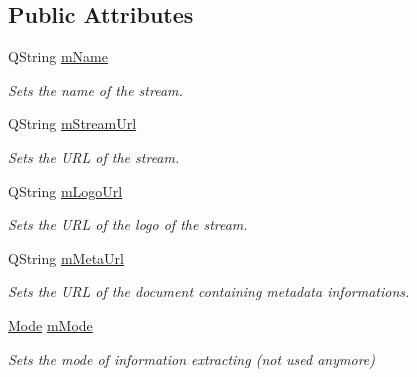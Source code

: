 \subsection*{Public Attributes}
\begin{DoxyCompactItemize}
\item 
\hypertarget{classProfile_ae9cc747f1b1a296a71535cc21c1f2e23}{
QString \hyperlink{classProfile_ae9cc747f1b1a296a71535cc21c1f2e23}{mName}}
\label{classProfile_ae9cc747f1b1a296a71535cc21c1f2e23}

\begin{DoxyCompactList}\small\item\em Sets the name of the stream. \item\end{DoxyCompactList}\item 
\hypertarget{classProfile_a480028e8369430791b8cc654d00442b2}{
QString \hyperlink{classProfile_a480028e8369430791b8cc654d00442b2}{mStreamUrl}}
\label{classProfile_a480028e8369430791b8cc654d00442b2}

\begin{DoxyCompactList}\small\item\em Sets the URL of the stream. \item\end{DoxyCompactList}\item 
\hypertarget{classProfile_a91bf8827db31d458cce1d3c3879e3042}{
QString \hyperlink{classProfile_a91bf8827db31d458cce1d3c3879e3042}{mLogoUrl}}
\label{classProfile_a91bf8827db31d458cce1d3c3879e3042}

\begin{DoxyCompactList}\small\item\em Sets the URL of the logo of the stream. \item\end{DoxyCompactList}\item 
\hypertarget{classProfile_a933dd175061d08e461c9cd409b957ede}{
QString \hyperlink{classProfile_a933dd175061d08e461c9cd409b957ede}{mMetaUrl}}
\label{classProfile_a933dd175061d08e461c9cd409b957ede}

\begin{DoxyCompactList}\small\item\em Sets the URL of the document containing metadata informations. \item\end{DoxyCompactList}\item 
\hypertarget{classProfile_abb0cd46ca588d24282e443d1481fcc49}{
\hyperlink{classProfile_a5fd99d2c6609c9239cd94d9208f6051b}{Mode} \hyperlink{classProfile_abb0cd46ca588d24282e443d1481fcc49}{mMode}}
\label{classProfile_abb0cd46ca588d24282e443d1481fcc49}

\begin{DoxyCompactList}\small\item\em Sets the mode of information extracting (not used anymore) \item\end{DoxyCompactList}\end{DoxyCompactItemize}


